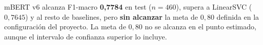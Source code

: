   \item mBERT v6 alcanza F1-macro \textbf{0{,}7784} en test ($n=460$), supera a LinearSVC ($0{,}7645$) y al resto de baselines, pero \textbf{sin alcanzar} la meta de $0{,}80$ definida en la configuración del proyecto. La meta de $0{,}80$ no se alcanza en el punto estimado, aunque el intervalo de confianza superior lo incluye.
